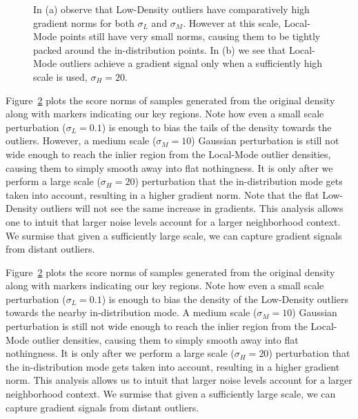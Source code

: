 \begin{figure}[tbhp]
\begin{subfigure}[b]{0.45\textwidth}
    \label{fig:score_norms_3d}
\end{subfigure}
\caption{In (a) observe that Low-Density outliers have comparatively high gradient norms for both $\sigma_{L}$ and $\sigma_{M}$. However at this scale, Local-Mode points still have very small norms, causing them to be tightly packed around the in-distribution points. In (b) we see that Local-Mode outliers achieve a gradient signal only when a sufficiently high scale is used, $\sigma_{H}=20$.}
\label{fig:norm_plots}
\end{figure}

Figure~\ref{fig:norm_plots} plots the score norms of samples generated from the original density along with markers indicating our key regions. Note how even a small scale perturbation ($\sigma_{L}=0.1$) is enough to bias the tails of the density towards the outliers. However, a medium scale ($\sigma_{M}=10$) Gaussian perturbation is still not wide enough to reach the inlier region from the Local-Mode outlier densities, causing them to simply smooth away into flat nothingness. It is only after we perform a large scale ($\sigma_{H}=20$) perturbation that the in-distribution mode gets taken into account, resulting in a higher gradient norm. Note that the flat Low-Density outliers will not see the same increase in gradients. This analysis allows one to intuit that larger noise levels account for a larger neighborhood context. We surmise that given a sufficiently large scale, we can capture gradient signals from distant outliers.

Figure~\ref{fig:norm_plots} plots the score norms of samples generated from the original density along with markers indicating our key regions. Note how even a small scale perturbation ($\sigma_{L}=0.1$) is enough to bias the density of the Low-Density outliers towards the nearby in-distribution mode. A medium scale ($\sigma_{M}=10$) Gaussian perturbation is still not wide enough to reach the inlier region from the Local-Mode outlier densities, causing them to simply smooth away into flat nothingness. It is only after we perform a large scale ($\sigma_{H}=20$) perturbation that the in-distribution mode gets taken into account, resulting in a higher gradient norm.
This analysis allows us to intuit that larger noise levels account for a larger neighborhood context. We surmise that given a sufficiently large scale, we can capture gradient signals from distant outliers.


